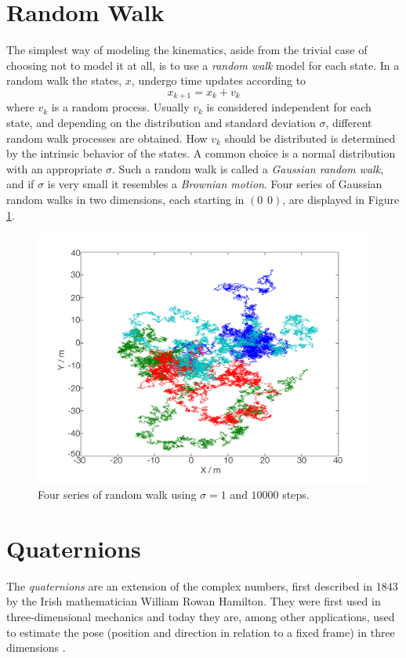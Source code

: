\documentclass{LTHthesis}
\begin{document}
\section{Random Walk}
%
The simplest way of modeling the kinematics, aside from the trivial case of choosing not to model it at all, is to use a \emph{random walk} model for each state. In a random walk the states, $x$, undergo time updates according to
%
\begin{equation}
x_{k+1} = x_k + v_k
\end{equation}      
%
where $v_k$ is a random process. Usually $v_k$ is considered independent for each state, and depending on the distribution and standard deviation $\sigma$, different random walk processes are obtained. How $v_k$ should be distributed is determined by the intrinsic behavior of the states. A common choice is a normal distribution with an appropriate $\sigma$. Such a random walk is called a \emph{Gaussian random walk}, and if $\sigma$ is very small it resembles a \emph{Brownian motion}. Four series of Gaussian random walks in two dimensions, each starting in $(0\hspace{5pt}0)$, are displayed in Figure \ref{rand_walk}. 
%
\begin{figure}[!hbt]

\includegraphics[width=1\textwidth ]{images/kinematic/rand_walk}
\caption{Four series of random walk using $\sigma = 1$ and $10000$ steps.}\label{rand_walk}
\end{figure}
%
\section{Quaternions}
%
The \emph{quaternions} are an extension of the complex numbers, first described in 1843 by the Irish mathematician William Rowan Hamilton. They were first used in three-dimensional mechanics and today they are, among other applications, used to estimate the pose (position and direction in relation to a fixed frame) in three dimensions \cite{mann13}.
%
\end{document}
